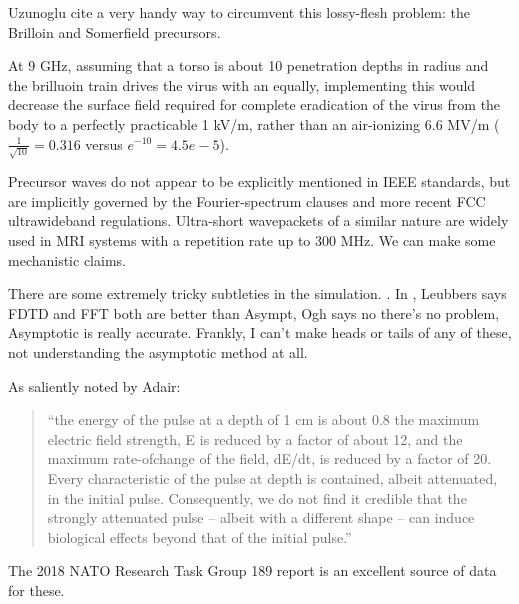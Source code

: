 \documentclass[paper.tex]{subfiles}
\begin{document}
Uzunoglu \cite{Theoretical2020} cite a very handy way to circumvent this lossy-flesh problem: the Brilloin and Somerfield precursors.



At 9 GHz, assuming that a torso is about 10 penetration depths in radius and the brilluoin train drives the virus with an equally, implementing this would decrease the surface field required for complete eradication of the virus from the body to a perfectly practicable 1 kV/m, rather than an air-ionizing 6.6 MV/m ($\frac{1}{\sqrt{10}}=0.316$ versus $e^{-10}=4.5e-5$). 



Precursor waves do not appear to be explicitly mentioned in IEEE standards, but are implicitly governed by the Fourier-spectrum clauses and more recent FCC ultrawideband regulations. Ultra-short wavepackets of a similar nature are widely used in MRI systems with a repetition rate up to 300 MHz. We can make some mechanistic claims.




\begin{sidenote}
There are some extremely tricky subtleties in the simulation.  \cite{propagation1992}. In \cite{Comments1993}, Leubbers says FDTD and FFT both are better than Asympt, Ogh says no there's no problem, Asymptotic is really accurate. Frankly, I can't make heads or tails of any of these, not understanding the asymptotic method at all.
\end{sidenote}




As saliently noted by Adair:

\begin{quote}
	“the energy of the pulse at a depth of 1 cm is about 0.8%
	the maximum electric field strength, E is reduced by a factor of about 12, and the maximum rate-ofchange of the field, dE/dt, is reduced by a factor of 20. Every characteristic of the pulse at depth is
	contained, albeit attenuated, in the initial pulse. Consequently, we do not find it credible that the
	strongly attenuated pulse – albeit with a different shape – can induce biological effects beyond that of
	the initial pulse.”
\end{quote}


The 2018 NATO Research Task Group 189 report \cite{treatyelectromagnetic} is an excellent source of data for these. 
\end{document}
